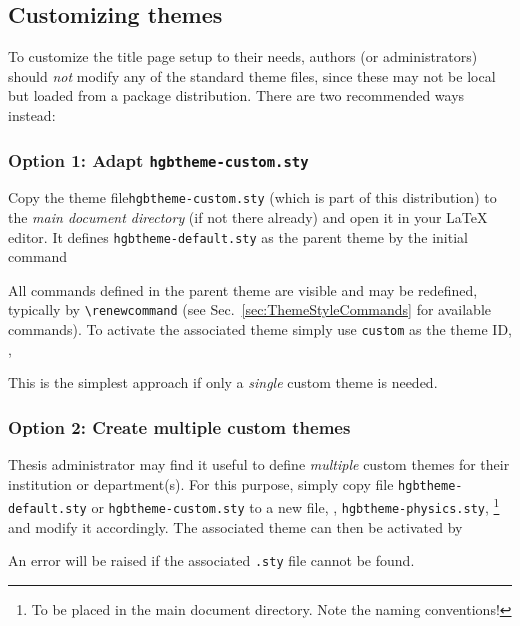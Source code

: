 \documentclass[english]{hgbarticle}
\begin{document}
\subsection{Customizing themes}

To customize the title page setup to their needs, authors (or administrators) should 
\emph{not} modify any of the standard theme files, since these may not be local but loaded
from a package distribution.
There are two recommended ways instead:

\subsubsection{Option 1: Adapt \texttt{hgbtheme-custom.sty}}

Copy the theme file\texttt{hgbtheme-custom.sty} (which is part of this distribution) to the 
\emph{main document directory} (if not there already) and open it in your LaTeX editor.
It defines \texttt{hgbtheme-default.sty} as the parent theme by the initial command
\begin{LaTeXCode}[numbers=none]
\end{LaTeXCode}
%
All commands defined in the parent theme are visible and may be redefined,
typically by \verb!\renewcommand! (see Sec.\ \ref{sec:ThemeStyleCommands}
for available commands).
To activate the associated theme simply use \texttt{custom} as the theme ID,
\ie,
%
%
This is the simplest approach if only a \emph{single} custom theme is needed.

\subsubsection{Option 2: Create multiple custom themes}

Thesis administrator may find it useful to define \emph{multiple} custom themes for their
institution or department(s).
For this purpose, simply copy file \texttt{hgbtheme-default.sty} or \texttt{hgbtheme-custom.sty}
to a new file, \eg, \texttt{hgbtheme-physics.sty},%
\footnote{To be placed in the main document directory. Note the naming conventions!}
and modify it accordingly. The associated theme can then be activated by
%
%
An error will be raised if the associated \texttt{.sty} file cannot be found.
\end{document}
